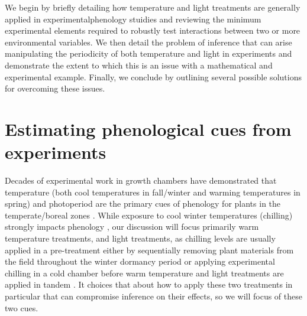 \documentclass[11pt]{article}
\begin{document}
We begin by briefly detailing how temperature and light treatments are generally applied in experimentalphenology stuidies and reviewing the minimum experimental elements required to robustly test interactions between two or more environmental variables. We then detail the problem of inference that can arise manipulating the periodicity of both temperature and light in experiments and demonstrate the extent to which this is an issue with a mathematical and experimental example. Finally, we conclude by outlining several possible solutions for overcoming these issues. 

\section*{Estimating phenological cues from experiments}
Decades of experimental work in growth chambers have demonstrated that temperature (both cool temperatures in fall/winter and warming temperatures in spring) and photoperiod are the primary cues of phenology for plants in the temperate/boreal zones \citep{Ettinger:2020aa}. While exposure to cool winter temperatures (chilling) strongly impacts phenology \citep{Laube2014}, our discussion will focus primarily warm temperature treatments, and light treatments, as chilling levels are usually applied in a pre-treatment either by sequentially removing plant materials from the field throughout the winter dormancy period \citep{limitingcues} or applying experimental chilling in a cold chamber before warm temperature and light treatments are applied in tandem \citep{Weinberger:1950aa,Flynn2018}. It choices that about how to apply these two treatments in particular that can compromise inference on their effects, so we will focus of these two cues.
\end{document}
